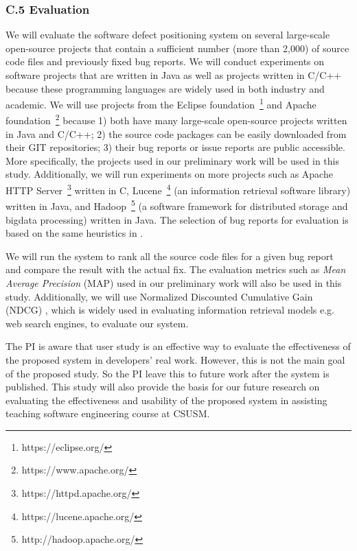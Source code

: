 \subsubsection{C.5 Evaluation}
We will evaluate the software defect positioning system on several large-scale open-source projects that contain a sufficient number (more than 2,000) of source code files and previously fixed bug reports. We will conduct experiments on software projects that are written in Java as well as projects written in C/C++ because these programming languages are widely used in both industry and academic. We will use projects from the Eclipse foundation~\footnote{https://eclipse.org/} and Apache foundation~\footnote{https://www.apache.org/} because 1) both have many large-scale open-source projects written in Java and C/C++; 2) the source code packages can be easily downloaded from their GIT repositories; 3) their bug reports or issue reports are public accessible. More specifically, the projects used in our preliminary work \cite{Ye:TSE15} will be used in this study. Additionally, we will run experiments on more projects such as Apache HTTP Server~\footnote{https://httpd.apache.org/} written in C, Lucene~\footnote{https://lucene.apache.org/} (an information retrieval software library) written in Java, and Hadoop~\footnote{http://hadoop.apache.org/} (a software framework for distributed storage and bigdata processing) written in Java. The selection of bug reports for evaluation is based on the same heuristics in \cite{Dallmeier:2007:EBL:1321631.1321702,Ye:FSE14}.

We will run the system to rank all the source code files for a given bug report and compare the result with the actual fix. The evaluation metrics such as \textit{Mean Average Precision} (MAP) \cite{Manning:2008:IIR:1394399} used in our preliminary work \cite{Ye:TSE15} will also be used in this study. Additionally, we will use Normalized Discounted Cumulative Gain (NDCG) \cite{Jarvelin:2002:CGE:582415.582418}, which is widely used in evaluating information retrieval models e.g. web search engines, to evaluate our system.

The PI is aware that user study is an effective way to evaluate the effectiveness of the proposed system in developers' real work. However, this is not the main goal of the proposed study. So the PI leave this to future work after the system is published. This study will also provide the basis for our future research on evaluating the effectiveness and usability of the proposed system in assisting teaching software engineering course at CSUSM.

